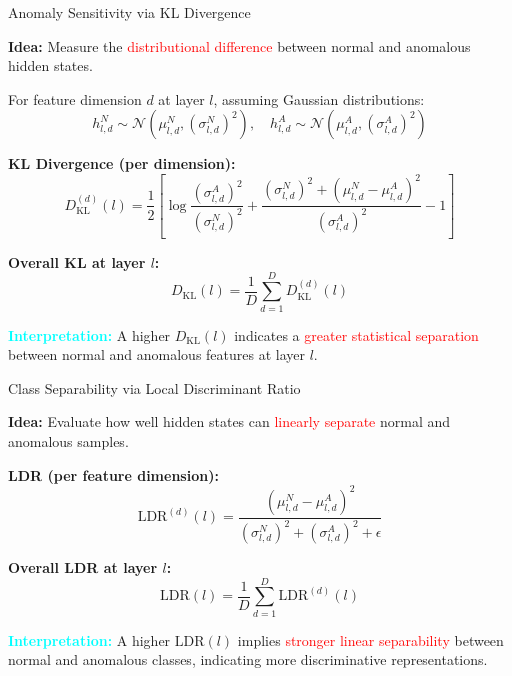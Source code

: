 \documentclass[aspectratio=169,xcolor=dvipsnames]{beamer}
\begin{document}
	
	\begin{frame}{Anomaly Sensitivity via KL Divergence}
		\small
		
		\textbf{Idea:} Measure the \textcolor{red}{distributional difference} between normal and anomalous hidden states.
		
		\vspace{0.8em}
		
		For feature dimension $d$ at layer $l$, assuming Gaussian distributions:
		\[
		h^N_{l,d} \sim \mathcal{N}(\mu^N_{l,d}, (\sigma^N_{l,d})^2), \quad
		h^A_{l,d} \sim \mathcal{N}(\mu^A_{l,d}, (\sigma^A_{l,d})^2)
		\]
		
		\vspace{0.5em}
		
		\textbf{KL Divergence (per dimension):}
		\[
		D^{(d)}_{\mathrm{KL}}(l)
		= \frac{1}{2}
		\left[
		\log \frac{(\sigma^A_{l,d})^2}{(\sigma^N_{l,d})^2}
		+ \frac{(\sigma^N_{l,d})^2 + (\mu^N_{l,d} - \mu^A_{l,d})^2}{(\sigma^A_{l,d})^2}
		- 1
		\right]
		\]
		
		\vspace{0.8em}
		
		\textbf{Overall KL at layer $l$:}
		\[
		D_{\mathrm{KL}}(l) = \frac{1}{D} \sum_{d=1}^{D} D^{(d)}_{\mathrm{KL}}(l)
		\]
		
		\vspace{0.8em}
		
		\textcolor{cyan}{\textbf{Interpretation:}}  
		A higher $D_{\mathrm{KL}}(l)$ indicates a \textcolor{red}{greater statistical separation} between normal and anomalous features at layer $l$.
		
	\end{frame}
	
	
	\begin{frame}{Class Separability via Local Discriminant Ratio}
		\small
		
		\textbf{Idea:} Evaluate how well hidden states can \textcolor{red}{linearly separate} normal and anomalous samples.
		
		\vspace{0.8em}
		
		\textbf{LDR (per feature dimension):}
		\[
		\mathrm{LDR}^{(d)}(l)
		=
		\frac{(\mu^N_{l,d} - \mu^A_{l,d})^2}
		{(\sigma^N_{l,d})^2 + (\sigma^A_{l,d})^2 + \epsilon}
		\]
		
		\vspace{0.8em}
		
		\textbf{Overall LDR at layer $l$:}
		\[
		\mathrm{LDR}(l) = \frac{1}{D} \sum_{d=1}^{D} \mathrm{LDR}^{(d)}(l)
		\]
		
		\vspace{1em}
		
		\textcolor{cyan}{\textbf{Interpretation:}}  
		A higher $\mathrm{LDR}(l)$ implies \textcolor{red}{stronger linear separability} between normal and anomalous classes, indicating more discriminative representations.
		
	\end{frame}
	
\end{document}
